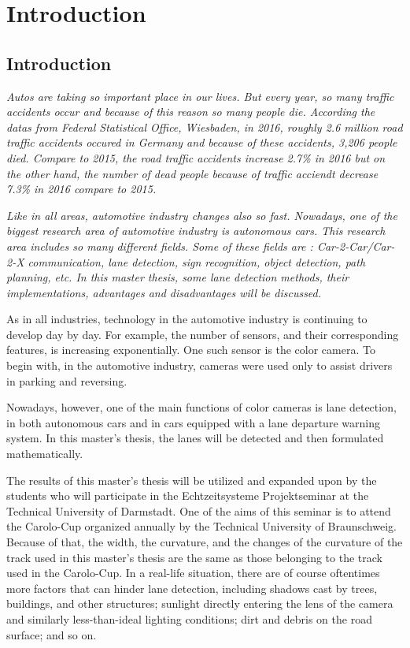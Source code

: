 
\chapter{Introduction}\label{cha:Intro}

\section{Introduction}\label{sec:Introduction}

\emph{\color{blue}Autos are taking so important place in our lives. But every year, so many traffic accidents occur and because of this reason so many people die. According the datas from  Federal Statistical Office, Wiesbaden, in 2016, roughly 2.6 million road traffic accidents occured in Germany and because of these accidents, 3,206 people died. Compare to 2015, the road traffic accidents increase 2.7\% in 2016 but on the other hand, the number of dead people because of traffic acciendt decrease 7.3\% in 2016 compare to 2015\cite{Statis}.}

\emph{\color{blue}Like in all areas, automotive industry changes also so fast. Nowadays, one of the biggest research area of automotive industry is autonomous cars. This research area includes so many different fields. Some of these fields are : Car-2-Car/Car-2-X communication, lane detection, sign recognition, object detection, path planning, etc. In this master thesis, some lane detection methods, their implementations, advantages and disadvantages will be discussed.}







As in all industries, technology in the automotive industry is continuing to develop day by day. For example, the number of sensors, and their corresponding features, is increasing exponentially. One such sensor is the color camera. To begin with, in the automotive industry, cameras were used only to assist drivers in parking and reversing.
 
Nowadays, however, one of the main functions of color cameras is lane detection, in both autonomous cars and in cars equipped with a lane departure warning system. In this master's thesis, the lanes will be detected and then formulated mathematically.

The results of this master's thesis will be utilized and expanded upon by the students who will participate in the Echtzeitsysteme Projektseminar at the Technical University of Darmstadt. One of the aims of this seminar is to attend the Carolo-Cup organized annually by the Technical University of Braunschweig. Because of that, the width, the curvature, and the changes of the curvature of the track used in this master's thesis are the same as those belonging to the track used in the Carolo-Cup. In a real-life situation, there are of course oftentimes more factors that can hinder lane detection, including shadows cast by trees, buildings, and other structures; sunlight directly entering the lens of the camera and similarly less-than-ideal lighting conditions; dirt and debris on the road surface; and so on.

